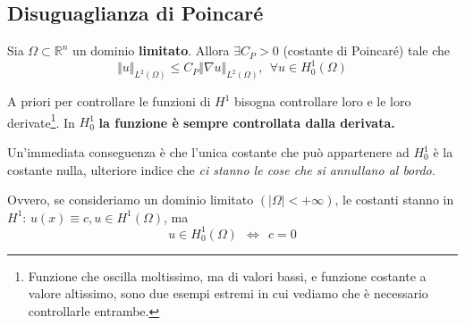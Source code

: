\documentclass[10pt,a4paper,twoside,openright]{book}
\begin{document}
\subsection{Disuguaglianza di Poincaré}
\begin{theorem}
	 Sia $\Omega \subset \mathbb{R}^{n}$ un dominio \textbf{limitato}. Allora $\exists C_{P}  >0$ (costante di Poincaré) tale che
	\begin{equation}
		\Vert u\Vert _{L^{2}( \Omega )} \leqslant C_{P}\Vert \nabla u\Vert _{L^{2}( \Omega )} ,\ \ \forall u\in H^{1}_{0}( \Omega )
	\end{equation}
\end{theorem}
A priori per controllare le funzioni di $H^{1}$ bisogna controllare loro e le loro derivate\footnote{Funzione che oscilla moltissimo, ma di valori bassi, e funzione costante a valore altissimo, sono due esempi estremi in cui vediamo che è necessario controllarle entrambe.}. In $H^{1}_{0}$ \textbf{la funzione è sempre controllata dalla derivata.}
\begin{oss}
	Un'immediata conseguenza è che l'unica costante che può appartenere ad $H^{1}_{0}$ è la costante nulla, ulteriore indice che \textit{ci stanno le cose che si annullano al bordo.}

	Ovvero, se consideriamo un dominio limitato $( |\Omega |< +\infty )$, le costanti stanno in $H^{1} $: $u( x) \equiv c,u\in H^{1}( \Omega )$,  ma
	\begin{equation*}
		u\in H_{0}^{1}( \Omega ) \ \ \Leftrightarrow \ \ c=0
	\end{equation*}
\end{oss}
\end{document}
